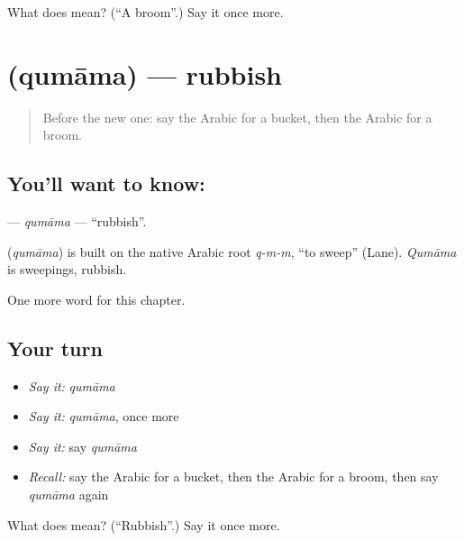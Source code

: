 \begin{tcolorbox}[breakable,colback=teal!4,colframe=teal!35!black,title={Before you move on}]
What does  mean? (\textquotedblleft{}A broom\textquotedblright{}.) Say it once more.
\end{tcolorbox}
\section[\texorpdfstring{\ar{قمامة} (qumāma)}{قمامة (qumāma)}]{ (qumāma) — rubbish}

\label{lesson:AR-C125-qumama}



\begin{quote}
Before the new one: say the Arabic for a bucket, then the Arabic for a broom.
\end{quote}

\subsection*{You'll want to know: }
\textbf{} — \emph{qumāma} — \textquotedblleft{}rubbish\textquotedblright{}.

\begin{cousinweb}
\textbf{} (\emph{qumāma}) is built on the native Arabic root \emph{q-m-m}, \textquotedblleft{}to sweep\textquotedblright{} (Lane). \emph{Qumāma} is sweepings, rubbish.
\end{cousinweb}

\begin{grammarlens}[title={What you've built}]
One more word for this chapter.
\end{grammarlens}

\subsection*{Your turn}
\begin{itemize}
\raggedright
  \item \emph{Say it:} \emph{qumāma}
  \item \emph{Say it:} \emph{qumāma}, once more
  \item \emph{Say it:} say \emph{qumāma}
  \item \emph{Recall:} say the Arabic for a bucket, then the Arabic for a broom, then say \emph{qumāma} again
\end{itemize}

\begin{tcolorbox}[breakable,colback=teal!4,colframe=teal!35!black,title={Before you move on}]
What does  mean? (\textquotedblleft{}Rubbish\textquotedblright{}.) Say it once more.
\end{tcolorbox}
